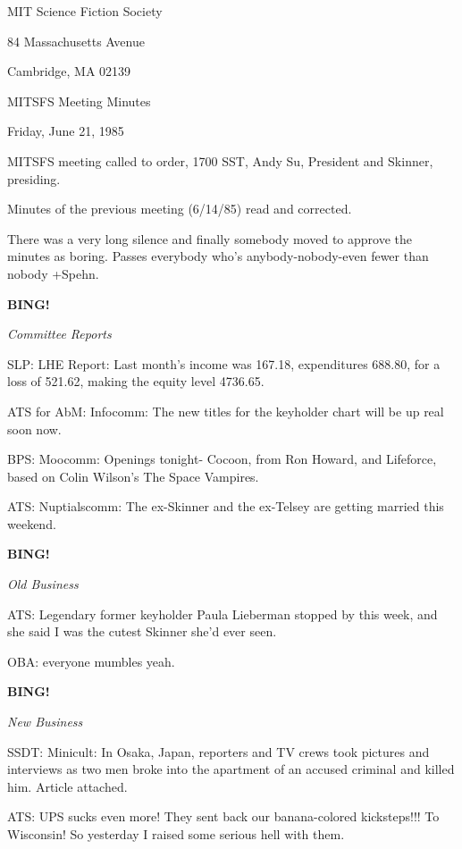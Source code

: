 \documentclass[12pt]{article}
\newcommand{\bing}{{\bf BING!} }
\newcommand{\goto}[1]{\bing \vskip 12pt \centerline{{\em{#1}}}}
\begin{document}
\begin{center}

MIT Science Fiction Society 

84 Massachusetts Avenue

Cambridge, MA 02139

\vspace{12pt}

MITSFS Meeting Minutes 

Friday, June 21, 1985

\end{center}
 
\vspace{18pt}

\setlength{\parskip}{6pt}

\noindent
MITSFS meeting called to order, 1700 SST,
Andy Su, President and Skinner, presiding.

Minutes of the previous meeting (6/14/85) read and corrected.

There was a very long silence and finally somebody moved to approve the minutes as boring. Passes everybody who's anybody-nobody-even fewer than nobody +Spehn.

\goto{Committee Reports}

SLP: LHE Report: Last month's income was 167.18, expenditures 688.80, for a loss of 521.62, making the equity level 4736.65.

ATS for AbM: Infocomm: The new titles for the keyholder chart will be up real soon now.

BPS: Moocomm: Openings tonight- Cocoon, from Ron Howard, and Lifeforce, based on Colin Wilson's The Space Vampires.

ATS: Nuptialscomm: The ex-Skinner and the ex-Telsey are getting married this weekend.

\goto{Old Business}

ATS: Legendary former keyholder Paula Lieberman stopped by this week, and she said I was the cutest Skinner she'd ever seen.

OBA: everyone mumbles yeah.

\goto{New Business}

SSDT: Minicult: In Osaka, Japan, reporters and TV crews took pictures and interviews as two men broke into the apartment of an accused criminal and killed him. Article attached.

ATS: UPS sucks even more! They sent back our banana-colored kicksteps!!! To Wisconsin! So yesterday I raised some serious hell with them.
\end{document}
